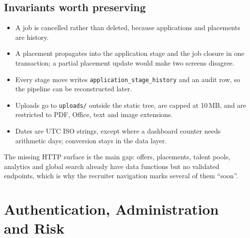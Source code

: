 \documentclass[11pt,a4paper]{article}
\newcommand{\file}[1]{\texttt{\small #1}}
\newcommand{\code}[1]{\texttt{#1}}
\begin{document}
\subsection{Invariants worth preserving}
\begin{itemize}[leftmargin=2em]
  \item A job is cancelled rather than deleted, because applications and
        placements are history.
  \item A placement propagates into the application stage and the job closure
        in one transaction; a partial placement update would make two screens
        disagree.
  \item Every stage move writes \code{application\_stage\_history} and an
        audit row, so the pipeline can be reconstructed later.
  \item Uploads go to \file{uploads/} outside the static tree, are capped at
        10\,MB, and are restricted to PDF, Office, text and image extensions.
  \item Dates are UTC ISO strings, except where a dashboard counter needs
        arithmetic days; conversion stays in the data layer.
\end{itemize}

The missing HTTP surface is the main gap: offers, placements, talent pools,
analytics and global search already have data functions but no validated
endpoints, which is why the recruiter navigation marks several of them
``soon''.

\section{Authentication, Administration and Risk}
\label{u:auth}
\end{document}
